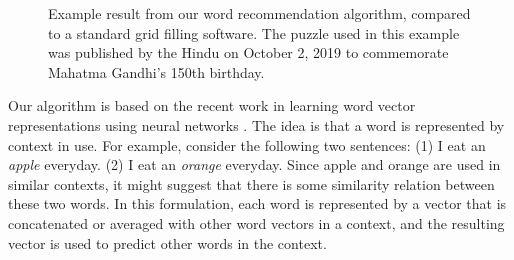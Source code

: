 \documentclass[twoside]{article}
\begin{document}
\begin{figure}[H]
{\begin{minipage}{\textwidth}
\begin{center}
   \label{fig:fig1}
   \end{center}
\end{minipage}}
\caption{Example result from our word recommendation algorithm, compared to a standard grid filling software. The puzzle used in this example was published by the Hindu on October 2, 2019 to commemorate Mahatma Gandhi's 150th birthday.}
\label{fig:figbox}
\end{figure}

Our algorithm is based on the recent work in learning word vector representations using neural networks \cite{cite9} \cite{cite10} \cite{cite11} \cite{cite12} \cite{cite13}. The idea is that a word is represented by context in use. For example, consider the following two sentences: (1) I eat an \textit{apple} everyday. (2) I eat an \textit{orange} everyday. Since apple and orange are used in similar contexts, it might suggest that there is some similarity relation between these two words. In this formulation, each word is represented by a vector that is concatenated or averaged with other word vectors in a context, and the resulting vector is used to predict other words in the context.
\end{document}
